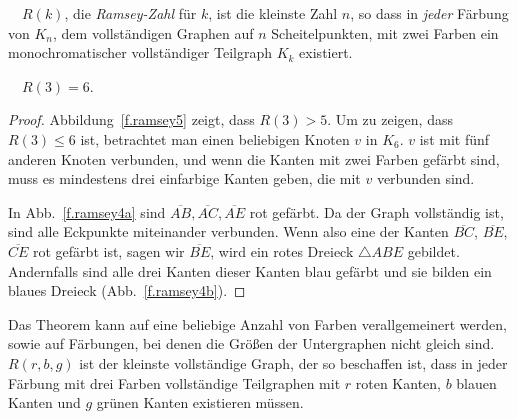 \begin{definition}
$\quad R(k)$, die \emph{Ramsey-Zahl} für $k$, ist die kleinste Zahl $n$, so dass in \emph{jeder} Färbung von $K_{n}$, dem vollständigen Graphen auf $n$ Scheitelpunkten, mit zwei Farben ein monochromatischer vollständiger Teilgraph $K_k$ existiert.
\end{definition}

\begin{theorem}[Ramsey]
$\quad R(3)=6$.\label{thm.ramsey}
\end{theorem}

\begin{proof}

Abbildung~\ref{f.ramsey5} zeigt, dass $R(3)>5$. Um zu zeigen, dass $R(3)\leq 6$ ist, betrachtet man einen beliebigen Knoten $v$ in $K_6$. $v$ ist mit fünf anderen Knoten verbunden, und wenn die Kanten mit zwei Farben gefärbt sind, muss es mindestens drei einfarbige Kanten geben, die mit $v$ verbunden sind. 

In Abb.~\ref{f.ramsey4a} sind $\overline{AB}, \overline{AC}, \overline{AE}$ rot gefärbt. Da der Graph vollständig ist, sind alle Eckpunkte miteinander verbunden. Wenn also eine der Kanten $\overline{BC}$, $\overline{BE}$, $\overline{CE}$ rot gefärbt ist, sagen wir $\overline{BE}$, wird ein rotes Dreieck $\triangle ABE$ gebildet. Andernfalls sind alle drei Kanten dieser Kanten blau gefärbt und sie bilden ein blaues Dreieck (Abb.~\ref{f.ramsey4b}).
\end{proof}

Das Theorem kann auf eine beliebige Anzahl von Farben verallgemeinert werden, sowie auf Färbungen, bei denen die Größen der Untergraphen nicht gleich sind. $R(r,b,g)$ ist der kleinste vollständige Graph, der so beschaffen ist, dass in jeder Färbung mit drei Farben vollständige Teilgraphen mit $r$ roten Kanten, $b$ blauen Kanten und $g$ grünen Kanten existieren müssen.

